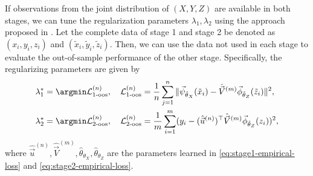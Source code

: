 If observations from the joint distribution of $(X, Y, Z)$ are available in both stages, we can tune the regularization parameters $\lambda_1, \lambda_2$ using the approach proposed in \citet{Singh2019}. Let the complete data of stage 1 and stage 2 be denoted as $(x_i, y_i, z_i)$ and $(\tilde x_i, \tilde y_i, \tilde z_i)$. Then, we can use the data not used in each stage to evaluate the out-of-sample performance of the other stage. Specifically, the regularizing parameters are given by
\begin{align*}
    &\lambda_1^* = \argmin \mathcal{L}_{1\text{-oos}}^{(n)}, \quad \mathcal{L}_{1\text{-oos}}^{(n)} = \frac1n \sum_{j=1}^n \|\vec{\psi}_{\hat\theta_X}(\tilde x_i) - \hat{\vec{V}}^{(m)}\vec{\phi}_{\hat\theta_Z}(\tilde z_i)\|^2,\\
    &\lambda_2^* = \argmin \mathcal{L}_{2\text{-oos}}^{(n)}, \quad\mathcal{L}_{2\text{-oos}}^{(n)} = \frac1m \sum_{i=1}^m (y_i - (\hat{\vec{u}}^{(n)})^\top \hat{\vec{V}}^{(m)} \vec{\phi}_{\hat\theta_Z}(z_i))^2,
\end{align*}
where $\hat{\vec{u}}^{(n)}, \hat{\vec{V}}^{(m)}, \hat{\theta}_{\theta_X}, \hat{\theta}_{\theta_Z}$ are the parameters learned in \eqref{eq:stage1-empirical-loss} and \eqref{eq:stage2-empirical-loss}.
